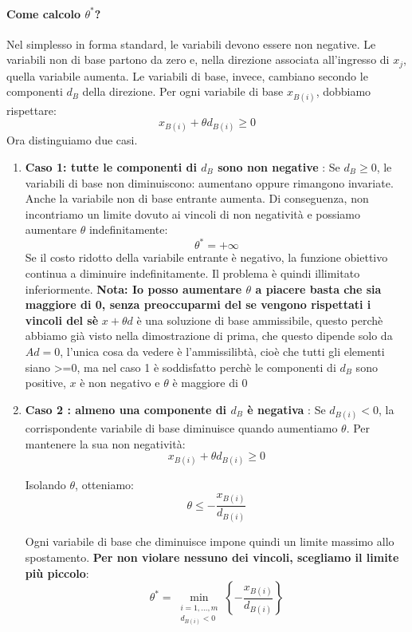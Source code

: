 \paragraph{Come calcolo \(\theta^*\)?}
Nel simplesso in forma standard, le variabili devono essere non negative. Le variabili non di base partono da zero e, nella direzione associata all'ingresso di \(x_j\), quella variabile aumenta.
Le variabili di base, invece, cambiano secondo le componenti \(d_B\) della direzione. Per ogni variabile di base \(x_{B(i)}\), dobbiamo rispettare:
\[
x_{B(i)}+\theta d_{B(i)}\geq 0
\]
Ora distinguiamo due casi.
\begin{enumerate}
    \item \textbf{Caso 1: tutte le componenti di $d_B$ sono non negative} : 
    Se \(d_B\geq 0\), le variabili di base non diminuiscono: aumentano oppure rimangono invariate. Anche la variabile non di base entrante aumenta.
    Di conseguenza, non incontriamo un limite dovuto ai vincoli di non negatività e possiamo aumentare \(\theta\) indefinitamente:
    \[
    \theta^*=+\infty
    \]
    Se il costo ridotto della variabile entrante è negativo, la funzione obiettivo continua a diminuire indefinitamente. Il problema è quindi illimitato inferiormente.
    \textbf{Nota: Io posso aumentare $\theta$ a piacere basta che sia maggiore di 0, senza preoccuparmi del se vengono rispettati i vincoli del sè} $x+\theta d$ è una soluzione di base ammissibile,
    questo perchè abbiamo già visto nella dimostrazione di prima, che questo dipende solo da $Ad = 0$, l'unica cosa da vedere è l'ammissilibtà, cioè che tutti gli elementi siano >=0, ma nel caso 1 è soddisfatto perchè le componenti di $d_B$ sono positive, $x$ è non negativo e $\theta$ è maggiore di 0
    \item \textbf{Caso 2 : almeno una componente di $d_B$ è negativa} : 
    Se \(d_{B(i)}<0\), la corrispondente variabile di base diminuisce quando aumentiamo \(\theta\).
    Per mantenere la sua non negatività:
    \[
    x_{B(i)}+\theta d_{B(i)}\geq 0
    \]

    Isolando \(\theta\), otteniamo:
    \[
    \theta\leq-\frac{x_{B(i)}}{d_{B(i)}}
    \]

    Ogni variabile di base che diminuisce impone quindi un limite massimo allo spostamento. \textbf{Per non violare nessuno dei vincoli, scegliamo il limite più piccolo}:
    \[
    \boxed{
    \theta^*=
    \min_{\substack{i=1,\ldots,m\\d_{B(i)}<0}}
    \left\{-\frac{x_{B(i)}}{d_{B(i)}}\right\}
    }
    \]
\end{enumerate}

